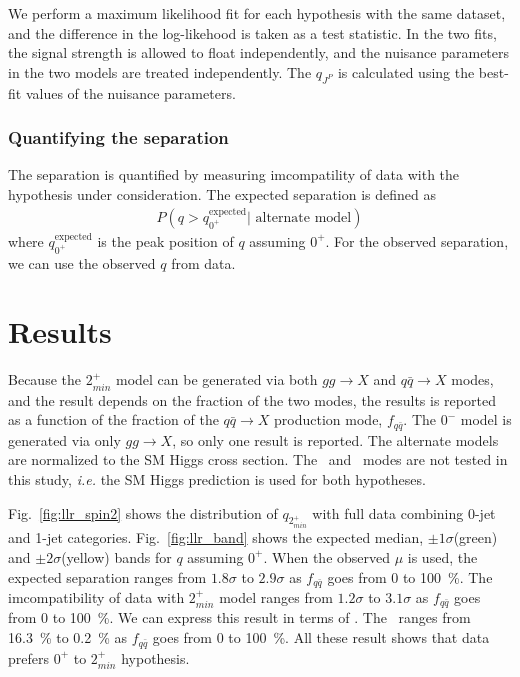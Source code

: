 We perform a maximum likelihood fit for each hypothesis with the same dataset,
and the difference in the log-likehood is taken as a test statistic. 
In the two fits, the signal strength is allowed to float independently, 
and the nuisance parameters in the two models are treated independently. 
The $q_{J^P}$ is calculated using the best-fit values of the nuisance parameters. 

\subsubsection{Quantifying the separation}

The separation is quantified by measuring imcompatility of data with 
the hypothesis under consideration. The expected separation is defined as  
\begin{eqnarray} 
P(q > q_{0^+}^{\textrm{expected}} | \textrm{ alternate model}) 
\end{eqnarray} 
where $q_{0^+}^{\textrm{expected}}$ is the peak position of $q$ assuming $0^+$.
For the observed separation, we can use the observed $q$ from data. 

\section{Results}

Because the $2_{min}^+$ model can be generated via both $gg\rightarrow X$ 
and $q\bar{q }\rightarrow X$ modes, and the result depends on the fraction of the two modes, 
the results is reported as a function of the fraction of the $q\bar{q} \rightarrow X$ production mode, 
$f_{q\bar{q}}$. The $0^-$ model is generated via only $gg\rightarrow X$,
so only one result is reported. The alternate models are normalized to the 
SM Higgs cross section. The \qqH\ and \qqVH\ modes are not tested in this study, 
\textit{i.e.} the SM Higgs prediction is used for both hypotheses. 

Fig.~\ref{fig:llr_spin2} shows the distribution of $q_{2_{min}^+}$ with full data 
combining 0-jet and 1-jet categories. 
Fig.~\ref{fig:llr_band} shows the expected median, $\pm1\sigma$(green) 
and  $\pm2\sigma$(yellow) bands for $q$ assuming $0^+$. 
When the observed $\mu$ is used, the expected separation ranges from 
$1.8\sigma$ to $2.9\sigma$ as $f_{q\bar{q}}$ goes from 0 to 100~\%.
The imcompatibility of data with $2_{min}^+$ model ranges from  
$1.2\sigma$ to $3.1\sigma$ as $f_{q\bar{q}}$ goes from 0 to 100~\%.
We can express this result in terms of \CLs. The \CLs\ ranges from 
16.3~\% to 0.2~\% as $f_{q\bar{q}}$ goes from 0 to 100~\%.
All these result shows that data prefers $0^+$ to $2_{min}^+$ hypothesis.  

